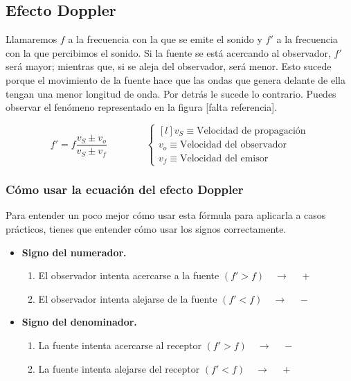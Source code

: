 \documentclass[a4paper]{book}
\begin{document}
\subsection{Efecto Doppler}
Llamaremos $f$ a la frecuencia con la que se emite el sonido y $f'$ a la frecuencia con la que percibimos el sonido. Si la fuente se está acercando al observador, $f'$ será mayor; mientras que, si se aleja del observador, será menor. Esto sucede porque el movimiento de la fuente hace que las ondas que genera delante de ella tengan una menor longitud de onda. Por detrás le sucede lo contrario. Puedes observar el fenómeno representado en la figura [falta referencia].

\[\boxed{f' = f\frac{v_S \pm v_o}{v_S \pm v_f}} \qquad \qquad \left\{ \begin{matrix*}[l]
		v_S \equiv \text{Velocidad de propagación}\\[5pt]
		v_o \equiv \text{Velocidad del observador}\\[5pt]
		v_f \equiv \text{Velocidad del emisor}
	\end{matrix*} \right. \]

\subsubsection{Cómo usar la ecuación del efecto Doppler}
Para entender un poco mejor cómo usar esta fórmula para aplicarla a casos prácticos, tienes que entender cómo usar los signos correctamente.
\begin{itemize}
	\item \textbf{Signo del numerador.}
	      \begin{enumerate}
		      \item El observador intenta acercarse a la fuente $(f'>f) \quad \longrightarrow \quad$ \textcircled{+}
		      \item El observador intenta alejarse de la fuente $(f'<f) \quad \longrightarrow \quad$ \textcircled{$-$}
	      \end{enumerate}
	\item \textbf{Signo del denominador.}
	      \begin{enumerate}
		      \item La fuente intenta acercarse al receptor $(f'>f) \quad \longrightarrow \quad$ \textcircled{$-$}
		      \item La fuente intenta alejarse del receptor $(f'<f) \quad \longrightarrow \quad$ \textcircled{+}
	      \end{enumerate}
\end{itemize}
\end{document}
